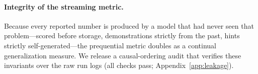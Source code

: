 \paragraph{Integrity of the streaming metric.}
Because every reported number is produced by a model that had never seen that
problem---scored before storage, demonstrations strictly from the past, hints
strictly self-generated---the prequential metric doubles as a continual
generalization measure. We release a causal-ordering audit that verifies these
invariants over the raw run logs (all checks pass; Appendix~\ref{app:leakage}).
